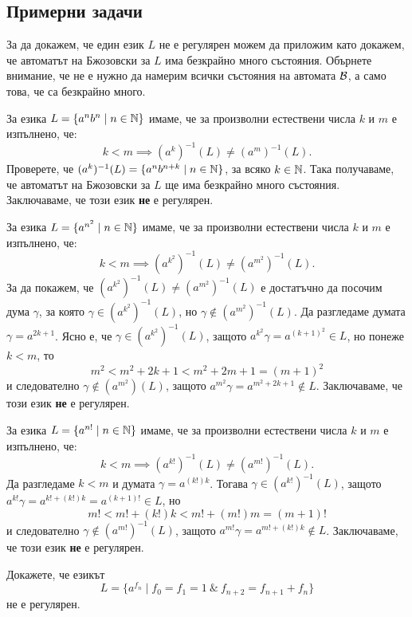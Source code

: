 \subsection*{Примерни задачи}

За да докажем, че един език $L$ не е регулярен можем да приложим 
като докажем, че автоматът на Бжозовски за $L$ има безкрайно много състояния.
Обърнете внимание, че не е нужно да намерим всички състояния на автомата $\mathcal{B}$, а само това, че са безкрайно много.

\begin{example}
  За езика $L = \{a^nb^n\mid n \in \mathbb{N}\}$ имаме, че за произволни естествени числа $k$ и $m$ е изпълнено, че:
  \[k < m \implies (a^k)^{-1}(L) \neq (a^m)^{-1}(L).\]
  Проверете, че $(a^k)^{-1}(L) = \{a^{n}b^{n+k} \mid n\in\mathbb{N}\}$, за всяко $k \in \mathbb{N}$.
  Така получаваме, че автоматът на Бжозовски за $L$ ще има безкрайно много състояния.
  Заключаваме, че този език {\bf не} е регулярен.
\end{example}

\begin{example}
  За езика $L = \{a^{n^2} \mid n \in \mathbb{N}\}$ имаме, че за произволни естествени числа $k$ и $m$ е изпълнено, че:
  \[k < m \implies (a^{k^2})^{-1}(L) \neq (a^{m^2})^{-1}(L).\]
  За да покажем, че $(a^{k^2})^{-1}(L) \neq (a^{m^2})^{-1}(L)$ е достатъчно да посочим дума $\gamma$, за която $ \gamma \in (a^{k^2})^{-1}(L)$, но $\gamma \not\in (a^{m^2})^{-1}(L)$.
  Да разгледаме думата $\gamma = a^{2k+1}$. Ясно е, че $\gamma \in (a^{k^2})^{-1}(L)$, защото $a^{k^2}\gamma = a^{(k+1)^2} \in L$, но понеже $k < m$, то
  \[m^2 < m^2 + 2k + 1 < m^2 + 2m + 1 = (m+1)^2\]
  и следователно $\gamma \not\in (a^{m^2})(L)$, защото $a^{m^2}\gamma = a^{m^2+2k+1}\not\in L$.
  Заключаваме, че този език {\bf не} е регулярен.
\end{example}

\begin{example}
  За езика $L = \{a^{n!} \mid n \in \mathbb{N}\}$ имаме, че за произволни естествени числа $k$ и $m$ е изпълнено, че:
  \[k < m \implies (a^{k!})^{-1}(L) \neq (a^{m!})^{-1}(L).\]
  Да разгледаме $k < m$ и думата $\gamma = a^{(k!)k}$.
  Тогава $\gamma \in (a^{k!})^{-1}(L)$, защото $a^{k!}\gamma = a^{k! + (k!)k} = a^{(k+1)!} \in L$, но 
  \[m! < m! + (k!)k < m! + (m!)m = (m+1)!\]
  и следователно $\gamma \not\in (a^{m!})^{-1}(L)$, защото $a^{m!}\gamma = a^{m!+(k!)k}\not\in L$.
  Заключаваме, че този език {\bf не} е регулярен.
\end{example}

\begin{problem}
  Докажете, че езикът 
  \[L = \{a^{f_n} \mid f_0 = f_1 = 1\ \&\ f_{n+2} = f_{n+1} + f_{n}\}\]
  не е регулярен.
\end{problem}

